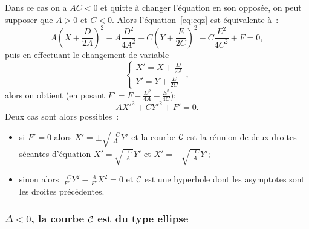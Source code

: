 Dans ce cas on a \(AC < 0\) et quitte à changer l'équation en son opposée, on 
peut supposer que \(A > 0\) et \(C < 0\). Alors l'équation~\eqref{eq:eqz} est 
équivalente à~:
\begin{equation}
  A\left(X + \frac{D}{2A}\right)^2 - A\frac{D^2}{4A^2} + 
  C\left(Y + \frac{E}{2C}\right)^2 - C\frac{E^2}{4C^2} + F = 0,
\end{equation}
puis en effectuant le changement de variable
\begin{equation}
  \begin{cases}
    X' = X + \frac{D}{2A} \\
    Y' = Y + \frac{E}{2C}
  \end{cases},
\end{equation}
alors on obtient (en posant \(F' = F - \frac{D^2}{4A} - \frac{E^2}{4C}\)):
\begin{equation}
  AX'^2 + CY'^2 + F' = 0.
\end{equation}
Deux cas sont alors possibles~:
\begin{itemize}
  \item si \(F' = 0\) alors \(X' = \pm \sqrt{\frac{-C}{A}}Y'\) et la courbe 
    \(\mathcal{C}_{{}}\) est la réunion de deux droites sécantes d'équation 
    \(X' = \sqrt{\frac{-C}{A}}Y'\) et \(X' = -\sqrt{\frac{-C}{A}}Y'\);
  \item sinon alors \(\frac{-C}{F'}Y^2-\frac{A}{F'}X^2 = 0\) et \(\mathcal{C}_{{}}\) est 
    une hyperbole dont les asymptotes sont les droites précédentes.
\end{itemize}

\subsubsection{\(\Delta<0\), la courbe \(\mathcal{C}_{{}}\) est du type ellipse}

